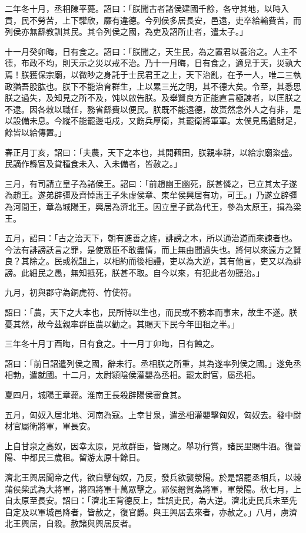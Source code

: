 \begin{pinyinscope}
二年冬十月，丞相陳平薨。詔曰：「朕聞古者諸侯建國千餘，各守其地，以時入貢，民不勞苦，上下驩欣，靡有違德。今列侯多居長安，邑遠，吏卒給輸費苦，而列侯亦無繇教訓其民。其令列侯之國，為吏及詔所止者，遣太子。」

十一月癸卯晦，日有食之。詔曰：「朕聞之，天生民，為之置君以養治之。人主不德，布政不均，則天示之災以戒不治。乃十一月晦，日有食之，適見于天，災孰大焉！朕獲保宗廟，以微眇之身託于士民君王之上，天下治亂，在予一人，唯二三執政猶吾股肱也。朕下不能治育群生，上以累三光之明，其不德大矣。令至，其悉思朕之過失，及知見之所不及，饨以啟告朕。及舉賢良方正能直言極諫者，以匡朕之不逮。因各敕以職任，務省繇費以便民。朕既不能遠德，故贳然念外人之有非，是以設備未息。今縱不能罷邊屯戍，又飭兵厚衛，其罷衛將軍軍。太僕見馬遺財足，餘皆以給傳置。」

春正月丁亥，詔曰：「夫農，天下之本也，其開藉田，朕親率耕，以給宗廟粢盛。民謫作縣官及貸種食未入、入未備者，皆赦之。」

三月，有司請立皇子為諸侯王。詔曰：「前趙幽王幽死，朕甚憐之，已立其太子遂為趙王。遂弟辟彊及齊悼惠王子朱虛侯章、東牟侯興居有功，可王。」乃遂立辟彊為河間王，章為城陽王，興居為濟北王。因立皇子武為代王，參為太原王，揖為梁王。

五月，詔曰：「古之治天下，朝有進善之旌，誹謗之木，所以通治道而來諫者也。今法有誹謗訞言之罪，是使眾臣不敢盡情，而上無由聞過失也。將何以來遠方之賢良？其除之。民或祝詛上，以相約而後相謾，吏以為大逆，其有他言，吏又以為誹謗。此細民之愚，無知抵死，朕甚不取。自今以來，有犯此者勿聽治。」

九月，初與郡守為銅虎符、竹使符。

詔曰：「農，天下之大本也，民所恃以生也，而民或不務本而事末，故生不遂。朕憂其然，故今茲親率群臣農以勸之。其賜天下民今年田租之半。」

三年冬十月丁酉晦，日有食之。十一月丁卯晦，日有蝕之。

詔曰：「前日詔遣列侯之國，辭未行。丞相朕之所重，其為遂率列侯之國。」遂免丞相勃，遣就國。十二月，太尉潁陰侯灌嬰為丞相。罷太尉官，屬丞相。

夏四月，城陽王章薨。淮南王長殺辟陽侯審食其。

五月，匈奴入居北地、河南為寇。上幸甘泉，遣丞相灌嬰擊匈奴，匈奴去。發中尉材官屬衛將軍，軍長安。

上自甘泉之高奴，因幸太原，見故群臣，皆賜之。舉功行賞，諸民里賜牛酒。復晉陽、中都民三歲租。留游太原十餘日。

濟北王興居聞帝之代，欲自擊匈奴，乃反，發兵欲襲滎陽。於是詔罷丞相兵，以棘蒲侯柴武為大將軍，將四將軍十萬眾擊之。祁侯繒賀為將軍，軍滎陽。秋七月，上自太原至長安。詔曰：「濟北王背德反上，詿誤吏民，為大逆。濟北吏民兵未至先自定及以軍城邑降者，皆赦之，復官爵。與王興居去來者，亦赦之。」八月，虜濟北王興居，自殺。赦諸與興居反者。


\end{pinyinscope}
